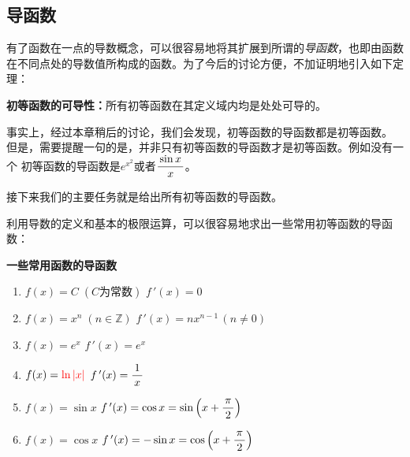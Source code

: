 \subsection{导函数}

有了函数在一点的导数概念，可以很容易地将其扩展到所谓的{\it 导函数}，也即由函数
在不同点处的导数值所构成的函数。为了今后的讨论方便，不加证明地引入如下定理：

\begin{thx}
	{\bf 初等函数的可导性：}所有初等函数在其定义域内均是处处可导的。
\end{thx}

事实上，经过本章稍后的讨论，我们会发现，初等函数的导函数都是初等函数。
但是，需要提醒一句的是，并非只有初等函数的导函数才是初等函数。例如没有一个
初等函数的导函数是$e^{x^2}$或者$\displaystyle\frac{\,{\sin x}\,}{\,{x}\,}$。

接下来我们的主要任务就是给出所有初等函数的导函数。

利用导数的定义和基本的极限运算，可以很容易地求出一些常用初等函数的导函数：

\begin{thx}
	{\bf 一些常用函数的导函数}
	\begin{enumerate}[(1)]
	  \item $f(x)=C\;(C\mbox{为常数})$ \hfill $f\,'(x)=0$ 
	  \item $f(x)=x^n\;(n\in\mathbb{Z})$ \hfill $f\,'(x)=nx^{n-1}\,(n\ne
	  0)$ 
	  \item $f(x)=e^x$ \hfill $f\,'(x)=e^x$ 
	  \item $f(x)={\color{red}\ln|x|}$ \hfill $f\,'(x)=\displaystyle\frac{\,{1}\,}{\,{x}\,}$ 
	  \item $f(x)=\sin x$ \hfill $f\,'(x)=\cos x=\sin\left(x+\displaystyle\frac{\,{\pi}\,}{\,{2}\,}\right)$ 
	  \item $f(x)=\cos x$ \hfill $f\,'(x)=-\sin x=\cos\left(x+\displaystyle\frac{\,{\pi}\,}{\,{2}\,}\right)$
	\end{enumerate}
\end{thx}

